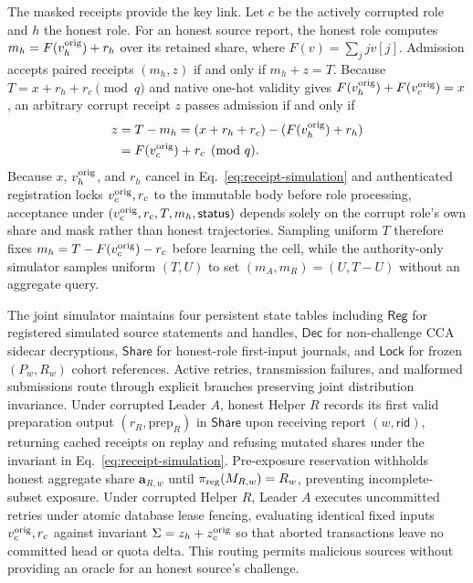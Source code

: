 \documentclass[conference,compsoc]{IEEEtran}
\theoremstyle{definition}
\numberwithin{equation}{section}
\numberwithin{table}{section}
\numberwithin{figure}{section}
\theoremstyle{plain}
\begin{document}
The masked receipts provide the key link. Let \(c\) be the actively corrupted role
and \(h\) the honest role. For an honest source report, the honest role computes
\(m_h = F(v_h^{\rm orig}) + r_h\) over its retained share, where \(F(v) = \sum_j j v[j]\).
Admission accepts paired receipts \((m_h, z)\) if and only if \(m_h + z = T\). Because
\(T = x + r_h + r_c \pmod q\) and native one-hot validity gives \(F(v_h^{\rm orig}) + F(v_c^{\rm orig}) = x\),
an arbitrary corrupt receipt \(z\) passes admission if and only if
\begin{equation}
\begin{aligned}
 z &= T - m_h = (x + r_h + r_c) - (F(v_h^{\rm orig}) + r_h) \\
   &= F(v_c^{\rm orig}) + r_c \pmod q.
\end{aligned}
 \label{eq:receipt-simulation}
\end{equation}
Because \(x\), \(v_h^{\rm orig}\), and \(r_h\) cancel in Eq.~\eqref{eq:receipt-simulation} and authenticated registration locks \(v_c^{\rm orig}, r_c\) to the immutable body before role processing, acceptance under \((v_c^{\rm orig}, r_c, T, m_h, \mathsf{status})\) depends solely on the corrupt role's own share and mask rather than honest trajectories. Sampling uniform \(T\) therefore fixes \(m_h = T - F(v_c^{\rm orig}) - r_c\) before learning the cell, while the authority-only simulator samples uniform \((T, U)\) to set \((m_A, m_R) = (U, T-U)\) without an aggregate query.

The joint simulator maintains four persistent state tables including \(\mathsf{Reg}\) for registered simulated source statements and handles, \(\mathsf{Dec}\) for non-challenge CCA sidecar decryptions, \(\mathsf{Share}\) for honest-role first-input journals, and \(\mathsf{Lock}\) for frozen \((P_w, R_w)\) cohort references. Active retries, transmission failures, and malformed submissions route through explicit branches preserving joint distribution invariance. Under corrupted Leader \(A\), honest Helper \(R\) records its first valid preparation output \((r_R, \mathrm{prep}_R)\) in \(\mathsf{Share}\) upon receiving report \((w, \mathsf{rid})\), returning cached receipts on replay and refusing mutated shares under the invariant in Eq.~\eqref{eq:receipt-simulation}. Pre-exposure reservation withholds honest aggregate share \(\mathbf a_{R,w}\) until \(\pi_{\rm reg}(M_{R,w}) = R_w\), preventing incomplete-subset exposure. Under corrupted Helper \(R\), Leader \(A\) executes uncommitted retries under atomic database lease fencing, evaluating identical fixed inputs \(v_c^{\rm orig}, r_c\) against invariant \(\Sigma = z_h + z_c^{\rm orig}\) so that aborted transactions leave no committed head or quota delta. This routing permits malicious sources without providing an oracle for an honest source's challenge.
\end{document}
